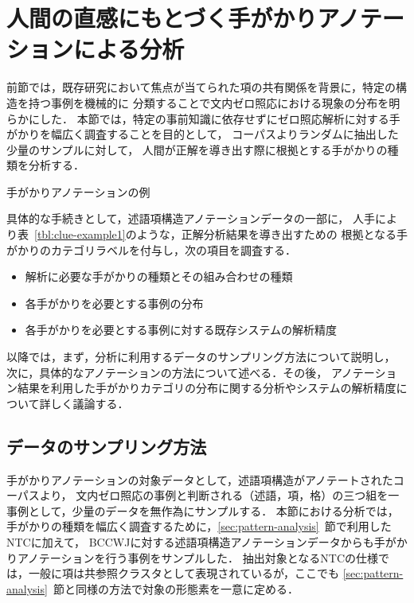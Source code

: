 \documentclass[japanese]{jnlp_1.4}
\begin{document}
\section{人間の直感にもとづく手がかりアノテーションによる分析}

前節では，既存研究において焦点が当てられた項の共有関係を背景に，特定の構造を持つ事例を機械的に
分類することで文内ゼロ照応における現象の分布を明らかにした．
本節では，特定の事前知識に依存せずにゼロ照応解析に対する手がかりを幅広く調査することを目的として，
コーパスよりランダムに抽出した少量のサンプルに対して，
人間が正解を導き出す際に根拠とする手がかりの種類を分析する．

\begin{table}[b]
\caption{手がかりアノテーションの例}
\label{tbl:clue-example1}

\end{table}

具体的な手続きとして，述語項構造アノテーションデータの一部に，
人手により表~\ref{tbl:clue-example1}のような，正解分析結果を導き出すための
根拠となる手がかりのカテゴリラベルを付与し，次の項目を調査する．
\begin{itemize}
	\item 解析に必要な手がかりの種類とその組み合わせの種類
	\item 各手がかりを必要とする事例の分布
	\item 各手がかりを必要とする事例に対する既存システムの解析精度
\end{itemize}

以降では，まず，分析に利用するデータのサンプリング方法について説明し，
次に，具体的なアノテーションの方法について述べる．その後，
アノテーション結果を利用した手がかりカテゴリの分布に関する分析やシステムの解析精度について詳しく議論する．


\subsection{データのサンプリング方法}

手がかりアノテーションの対象データとして，述語項構造がアノテートされたコーパスより，
文内ゼロ照応の事例と判断される（述語，項，格）の三つ組を一事例として，少量のデータを無作為にサンプルする．
本節における分析では，手がかりの種類を幅広く調査するために，\ref{sec:pattern-analysis}~節で利用したNTCに加えて，
BCCWJに対する述語項構造アノテーションデータからも手がかりアノテーションを行う事例をサンプルした．
抽出対象となるNTCの仕様では，一般に項は共参照クラスタとして表現されているが，ここでも
\ref{sec:pattern-analysis}~節と同様の方法で対象の形態素を一意に定める．
\end{document}
